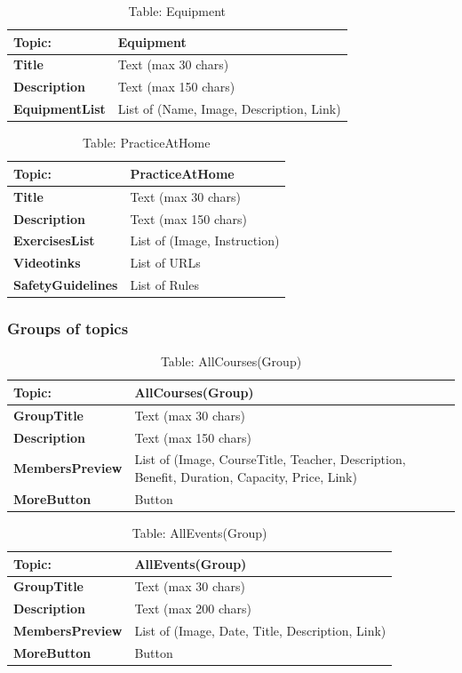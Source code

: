 \begin{table}[H]
\centering
\begin{tabularx}{\textwidth}{|>{\bfseries}l|X|}
\hline
Topic: & \textbf{Equipment} \\
\hline
Title & Text (max 30 chars) \\
\hline
Description & Text (max 150 chars) \\
\hline
EquipmentList & List of (Name, Image, Description, Link) \\
\hline
\end{tabularx}
\caption{Table: Equipment}
\end{table}

\begin{table}[H]
\centering
\begin{tabularx}{\textwidth}{|>{\bfseries}l|X|}
\hline
Topic: & \textbf{PracticeAtHome} \\
\hline
Title & Text (max 30 chars) \\
\hline
Description & Text (max 150 chars) \\
\hline
ExercisesList & List of (Image, Instruction) \\
\hline
Videotinks & List of URLs \\
\hline
SafetyGuidelines & List of Rules \\
\hline
\end{tabularx}
\caption{Table: PracticeAtHome}
\end{table}

\subsubsection{Groups of topics}

\begin{table}[H]
\centering
\begin{tabularx}{\textwidth}{|>{\bfseries}l|X|}
\hline
Topic: & \textbf{AllCourses(Group)} \\
\hline
GroupTitle & Text (max 30 chars) \\
\hline
Description & Text (max 150 chars) \\
\hline
MembersPreview & List of (Image, CourseTitle, Teacher, Description, Benefit, Duration, Capacity, Price, Link) \\
\hline
MoreButton & Button \\
\hline
\end{tabularx}
\caption{Table: AllCourses(Group)}
\end{table}

\begin{table}[H]
\centering
\begin{tabularx}{\textwidth}{|>{\bfseries}l|X|}
\hline
Topic: & \textbf{AllEvents(Group)} \\
\hline
GroupTitle & Text (max 30 chars) \\
\hline
Description & Text (max 200 chars) \\
\hline
MembersPreview & List of (Image, Date, Title, Description, Link) \\
\hline
MoreButton & Button \\
\hline
\end{tabularx}
\caption{Table: AllEvents(Group)}
\end{table}

